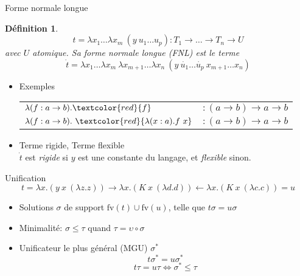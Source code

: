 \documentclass{beamer}
\newtheorem{mydefinition}{Définition}
\begin{document}
\begin{frame}{Forme normale longue}
\begin{mydefinition}
    $$t = \lambda x_1 \ldots \lambda x_m\ (y\ u_1 \ldots u_p) : T_1 \rightarrow \ldots \rightarrow T_n \rightarrow U$$
    avec $U$ atomique. Sa forme normale longue (FNL) est le terme
    $$ \dot{t} = \lambda x_1 \ldots \lambda x_m\ \lambda x_{m+1} \ldots \lambda x_n\ (y\ \dot{u_1} \ldots \dot{u_p}\ x_{m+1} \ldots x_n) $$
\end{mydefinition}
\begin{itemize}
    \item Exemples \\
    \begin{tabular}{l c}
        $\lambda( f : a \rightarrow b). \textcolor{red}{f}$ &
        $: (a\rightarrow b)\rightarrow a \rightarrow b$ \\
        $\lambda( f : a \rightarrow b). \ \textcolor{red}{\lambda (x : a).f\ x}$ &
        $:(a\rightarrow b)\rightarrow a \rightarrow b$
    \end{tabular}
    \item Terme rigide, Terme flexible \\
        $\dot{t}$ est \emph{rigide} si $y$ est une constante du langage, et \emph{flexible} sinon.
\end{itemize}
\end{frame}


\begin{frame}{Unification}
$$  t = \lambda x. (y \ x \ (\lambda z. z))
\longrightarrow \lambda x. (K \ x \ (\lambda d. d))
\longleftarrow  \lambda x. (K \ x \ (\lambda c. c)) = u $$
\begin{itemize}
    \item Solutions $\sigma$ de support $\text{fv}(t) \cup \text{fv}(u)$, telle que 
    $ t \sigma = u \sigma $
    \item Minimalité: $ \sigma \leq \tau$ quand $\tau = \upsilon \circ \sigma $
    \item Unificateur le plus général (MGU) $\sigma^{*}$
    $$ t\sigma^{*} = u\sigma^{*} $$
    $$ t\tau = u\tau \Longleftrightarrow \sigma^{*} \leq \tau $$
\end{itemize}
\end{frame}{}
\end{document}
